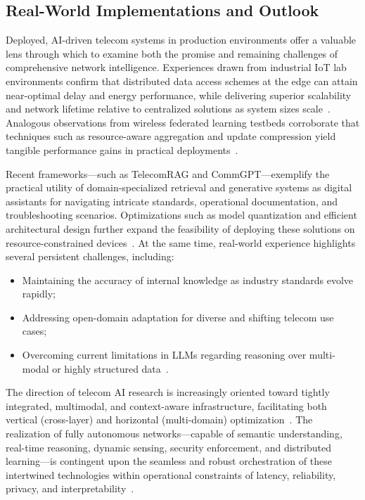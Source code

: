 \subsection{Real-World Implementations and Outlook}

Deployed, AI-driven telecom systems in production environments offer a valuable lens through which to examine both the promise and remaining challenges of comprehensive network intelligence. Experiences drawn from industrial IoT lab environments confirm that distributed data access schemes at the edge can attain near-optimal delay and energy performance, while delivering superior scalability and network lifetime relative to centralized solutions as system sizes scale~\cite{ref14}. Analogous observations from wireless federated learning testbeds corroborate that techniques such as resource-aware aggregation and update compression yield tangible performance gains in practical deployments~\cite{ref12}.

Recent frameworks—such as TelecomRAG and CommGPT—exemplify the practical utility of domain-specialized retrieval and generative systems as digital assistants for navigating intricate standards, operational documentation, and troubleshooting scenarios. Optimizations such as model quantization and efficient architectural design further expand the feasibility of deploying these solutions on resource-constrained devices~\cite{ref11,ref22,ref29}. At the same time, real-world experience highlights several persistent challenges, including:
\begin{itemize}
  \item Maintaining the accuracy of internal knowledge as industry standards evolve rapidly;
  \item Addressing open-domain adaptation for diverse and shifting telecom use cases;
  \item Overcoming current limitations in LLMs regarding reasoning over multi-modal or highly structured data~\cite{ref21,ref29}.
\end{itemize}

The direction of telecom AI research is increasingly oriented toward tightly integrated, multimodal, and context-aware infrastructure, facilitating both vertical (cross-layer) and horizontal (multi-domain) optimization~\cite{ref24,ref25}. The realization of fully autonomous networks—capable of semantic understanding, real-time reasoning, dynamic sensing, security enforcement, and distributed learning—is contingent upon the seamless and robust orchestration of these intertwined technologies within operational constraints of latency, reliability, privacy, and interpretability~\cite{ref14,ref19,ref20,ref24,ref26}.

